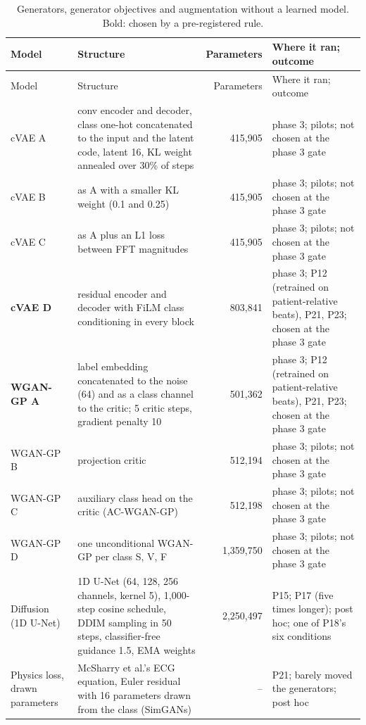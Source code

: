 \begin{longtable}{p{2.6cm}p{6.1cm}rp{4.6cm}}
\caption{Generators, generator objectives and augmentation without a learned model. Bold: chosen by a pre-registered rule.}\label{tab:arch-generators}\\
\toprule
Model & Structure & Parameters & Where it ran; outcome \\
\midrule
\endfirsthead
\toprule
Model & Structure & Parameters & Where it ran; outcome \\
\midrule
\endhead
\bottomrule
\endfoot
cVAE A & conv encoder and decoder, class one-hot concatenated to the input and the latent code, latent 16, KL weight annealed over 30\% of steps & 415,905 & phase 3; pilots; not chosen at the phase 3 gate \\
cVAE B & as A with a smaller KL weight (0.1 and 0.25) & 415,905 & phase 3; pilots; not chosen at the phase 3 gate \\
cVAE C & as A plus an L1 loss between FFT magnitudes & 415,905 & phase 3; pilots; not chosen at the phase 3 gate \\
\textbf{cVAE D} & residual encoder and decoder with FiLM class conditioning in every block & 803,841 & phase 3; P12 (retrained on patient-relative beats), P21, P23; chosen at the phase 3 gate \\
\textbf{WGAN-GP A} & label embedding concatenated to the noise (64) and as a class channel to the critic; 5 critic steps, gradient penalty 10 & 501,362 & phase 3; P12 (retrained on patient-relative beats), P21, P23; chosen at the phase 3 gate \\
WGAN-GP B & projection critic & 512,194 & phase 3; pilots; not chosen at the phase 3 gate \\
WGAN-GP C & auxiliary class head on the critic (AC-WGAN-GP) & 512,198 & phase 3; pilots; not chosen at the phase 3 gate \\
WGAN-GP D & one unconditional WGAN-GP per class S, V, F & 1,359,750 & phase 3; pilots; not chosen at the phase 3 gate \\
Diffusion (1D U-Net) & 1D U-Net (64, 128, 256 channels, kernel 5), 1,000-step cosine schedule, DDIM sampling in 50 steps, classifier-free guidance 1.5, EMA weights & 2,250,497 & P15; P17 (five times longer); post hoc; one of P18's six conditions \\
Physics loss, drawn parameters & McSharry et al.'s ECG equation, Euler residual with 16 parameters drawn from the class (SimGANs) & -- & P21; barely moved the generators; post hoc \\

\end{longtable}
